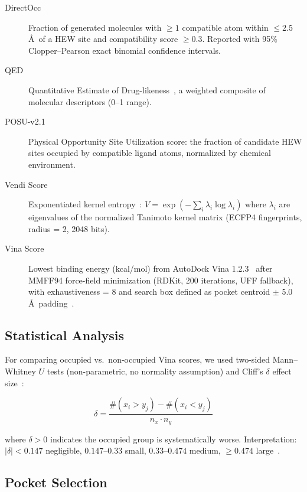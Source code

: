 \documentclass[11pt,letterpaper]{article}
\begin{document}
\begin{description}
  \item[DirectOcc] Fraction of generated molecules with $\ge 1$ compatible atom
    within $\le 2.5$\,\AA\ of a HEW site and compatibility score $\ge 0.3$.
    Reported with 95\% Clopper--Pearson exact binomial confidence intervals.
  \item[QED] Quantitative Estimate of Drug-likeness~\cite{bickerton2012}, a
    weighted composite of molecular descriptors (0--1 range).
  \item[POSU-v2.1] Physical Opportunity Site Utilization score: the fraction of
    candidate HEW sites occupied by compatible ligand atoms, normalized by
    chemical environment.
  \item[Vendi Score] Exponentiated kernel entropy~\cite{friedman2023vendi}:
    $V = \exp(-\sum_i \lambda_i \log \lambda_i)$ where $\lambda_i$ are
    eigenvalues of the normalized Tanimoto kernel matrix (ECFP4 fingerprints,
    radius = 2, 2048 bits).
  \item[Vina Score] Lowest binding energy (kcal/mol) from AutoDock Vina
    1.2.3~\cite{trott2010} after MMFF94 force-field minimization (RDKit, 200
    iterations, UFF fallback), with exhaustiveness = 8 and search box defined as
    pocket centroid $\pm$ 5.0\,\AA\ padding~\cite{eastman2017}.
\end{description}

\subsection{Statistical Analysis}

For comparing occupied vs.\ non-occupied Vina scores, we used two-sided
Mann--Whitney $U$ tests (non-parametric, no normality assumption) and Cliff's
$\delta$ effect size~\cite{cliff1993}:

\begin{equation}\label{eq:cliff}
\delta = \frac{\#(x_i > y_j) - \#(x_i < y_j)}{n_x \cdot n_y}
\end{equation}

where $\delta > 0$ indicates the occupied group is systematically worse.
Interpretation: $|\delta| < 0.147$ negligible, $0.147$--$0.33$ small,
$0.33$--$0.474$ medium, $\ge 0.474$ large~\cite{romano2006}.

\subsection{Pocket Selection}
\end{document}
